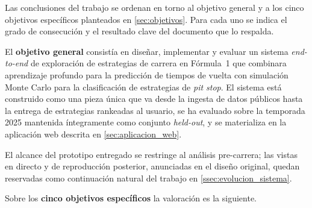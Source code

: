 Las conclusiones del trabajo se ordenan en torno al objetivo general y a los cinco objetivos específicos planteados en \ref{sec:objetivos}. Para cada uno se indica el grado de consecución y el resultado clave del documento que lo respalda.

El \textbf{objetivo general} consistía en diseñar, implementar y evaluar un sistema \textit{end-to-end} de exploración de estrategias de carrera en Fórmula~1 que combinara aprendizaje profundo para la predicción de tiempos de vuelta con simulación Monte Carlo para la clasificación de estrategias de \textit{pit stop}. El sistema está construido como una pieza única que va desde la ingesta de datos públicos hasta la entrega de estrategias rankeadas al usuario, se ha evaluado sobre la temporada 2025 mantenida íntegramente como conjunto \textit{held-out}, y se materializa en la aplicación web descrita en \ref{sec:aplicacion_web}. 

El alcance del prototipo entregado se restringe al análisis pre-carrera; las vistas en directo y de reproducción posterior, anunciadas en el diseño original, quedan reservadas como continuación natural del trabajo en \ref{ssec:evolucion_sistema}.

Sobre los \textbf{cinco objetivos específicos} la valoración es la siguiente.

